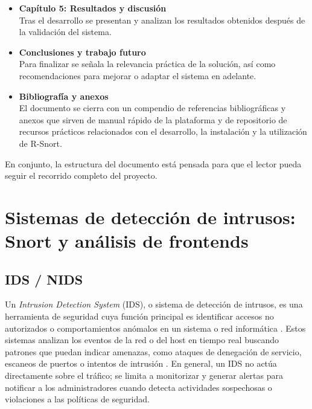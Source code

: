 \documentclass[11pt,a4paper,twoside]{report}
\newcounter{anexo}
\begin{document}
\begin{itemize}
	\item \textbf{Capítulo 5: Resultados y discusión}\\
	\hspace*{1em}Tras el desarrollo se presentan y analizan los resultados obtenidos después de la validación del sistema.
	
	\item \textbf{Conclusiones y trabajo futuro}\\
	\hspace*{1em}Para finalizar se señala la relevancia práctica de la solución, así como recomendaciones para mejorar o adaptar el sistema en adelante.
	
	\item \textbf{Bibliografía y anexos}\\
	\hspace*{1em}El documento se cierra con un compendio de referencias bibliográficas y anexos que sirven de manual rápido de la plataforma y de repositorio de recursos prácticos relacionados con el desarrollo, la instalación y la utilización de R-Snort.
\end{itemize}

En conjunto, la estructura del documento está pensada para que el lector pueda seguir el recorrido completo del proyecto.

\setcounter{secnumdepth}{2} 

\clearpage
\null
\thispagestyle{empty}
\newpage
\chapter{Sistemas de detección de intrusos: Snort y análisis de frontends}

\section{IDS / NIDS}

Un \textit{Intrusion Detection System} (IDS), o sistema de detección de intrusos, es una herramienta de seguridad cuya función principal es identificar accesos no autorizados o comportamientos anómalos en un sistema o red informática \cite{wikiNIDS}. Estos sistemas analizan los eventos de la red o del host en tiempo real buscando patrones que puedan indicar amenazas, como ataques de denegación de servicio, escaneos de puertos o intentos de intrusión \cite{NISTSP80094}. En general, un IDS no actúa directamente sobre el tráfico; se limita a monitorizar y generar alertas para notificar a los administradores cuando detecta actividades sospechosas o violaciones a las políticas de seguridad.\newline
\end{document}
